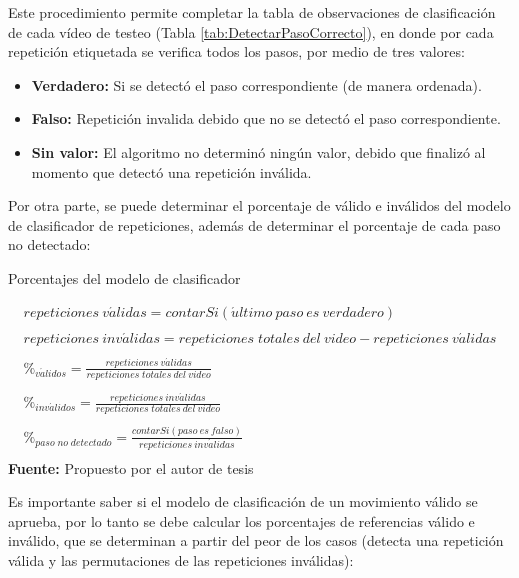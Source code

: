 Este procedimiento permite completar la tabla de observaciones de clasificaci\'on de cada v\'ideo de testeo (Tabla \ref{tab:DetectarPasoCorrecto}), en donde por cada repetici\'on etiquetada se verifica todos los pasos, por medio de tres valores:
\begin{itemize}
\item \textbf{Verdadero:} Si se detect\'o el paso correspondiente (de manera ordenada).
\item \textbf{Falso:} Repetici\'on invalida debido que no se detect\'o el paso correspondiente. 
\item \textbf{Sin valor:} El algoritmo no determin\'o ning\'un valor, debido que finaliz\'o al momento  que detect\'o una repetici\'on inv\'alida.
\end{itemize}
Por otra parte, se puede determinar el porcentaje de v\'alido e inv\'alidos del modelo de clasificador de repeticiones, adem\'as de determinar el porcentaje de cada paso no detectado:
\begin{formula}[H]
	\centering
	\caption{Porcentajes del modelo de clasificador}
	\label{frm:porcentajeClasificador}
	\begin{equation}
\begin{matrix}
repeticiones\: v\acute{a}lidas = contarSi(\acute{u}ltimo\: paso\: es\: verdadero) \\ 
 \\ 
repeticiones\: inv\acute{a}lidas = repeticiones\; totales\: del\: video - repeticiones\: v\acute{a}lidas\\ 
 \\ 
\%_{v\acute{a}lidos}=\frac{repeticiones\: v\acute{a}lidas}{repeticiones\; totales\: del\: video}\\ 
\\
\%_{inv\acute{a}lidos}=\frac{repeticiones\: inv\acute{a}lidas}{repeticiones\; totales\: del\: video}\\ 
\\ 
\%_{paso\; no\; detectado}=\frac{contarSi(paso\: es\: falso)}{repeticiones\: inv\acute{a}lidas}\\ 
\end{matrix}
	\end{equation}
	\textbf{Fuente:} Propuesto por el autor de tesis
\end{formula}
Es importante saber si el modelo de clasificaci\'on  de un movimiento v\'alido se aprueba, por lo tanto se debe calcular los porcentajes de referencias v\'alido e inv\'alido, que se determinan a partir del peor de los casos (detecta una repetici\'on v\'alida y las permutaciones de las  repeticiones inv\'alidas): 
